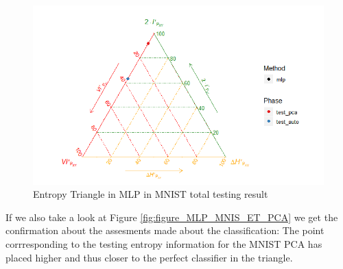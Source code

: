 \begin{figure}[H]
	\centering
	\includegraphics[width=1\linewidth]{Figuras_tfg/MNIST_performance_test}
	\caption{Entropy Triangle in MLP in MNIST total testing result}
	\label{fig:figure_MLP_MNIS_ET_Total}
\end{figure}

If we also take a look at Figure \ref{fig:figure_MLP_MNIS_ET_PCA} we get the confirmation about the assesments made about the classification: The point corrresponding to the testing entropy information for the MNIST PCA has placed higher and thus closer to the perfect classifier in the triangle. \par

